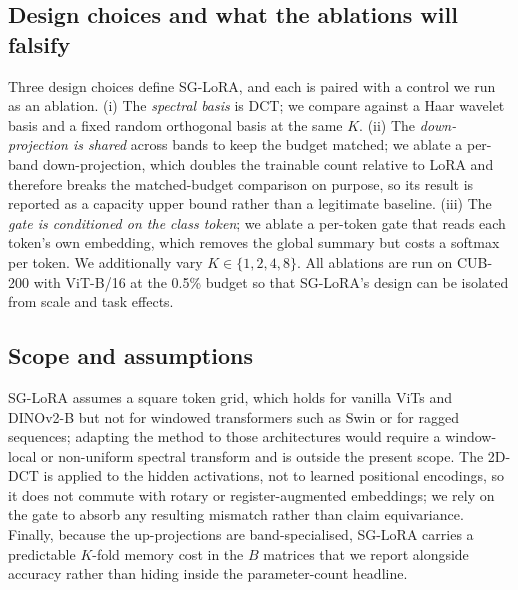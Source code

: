 \documentclass{article}
\begin{document}
\subsection{Design choices and what the ablations will falsify}

Three design choices define SG-LoRA, and each is paired with a control
we run as an ablation. (i) The \emph{spectral basis} is DCT; we compare
against a Haar wavelet basis and a fixed random orthogonal basis at
the same $K$. (ii) The \emph{down-projection is shared} across bands
to keep the budget matched; we ablate a per-band down-projection,
which doubles the trainable count relative to LoRA and therefore
breaks the matched-budget comparison on purpose, so its result is
reported as a capacity upper bound rather than a legitimate baseline.
(iii) The \emph{gate is conditioned on the class token}; we ablate a
per-token gate that reads each token's own embedding, which removes
the global summary but costs a softmax per token. We additionally vary
$K \in \{1,2,4,8\}$. All ablations are run on CUB-200 with ViT-B/16 at
the 0.5\% budget so that SG-LoRA's design can be isolated from scale
and task effects.

\subsection{Scope and assumptions}

SG-LoRA assumes a square token grid, which holds for vanilla ViTs
\citep{dosovitskiy2021vit} and DINOv2-B \citep{oquab2024dinov2} but
not for windowed transformers such as Swin \citep{liu2021swin} or for
ragged sequences; adapting the method to those architectures would
require a window-local or non-uniform spectral transform and is
outside the present scope. The 2D-DCT is applied to the hidden
activations, not to learned positional encodings, so it does not
commute with rotary or register-augmented embeddings; we rely on the
gate to absorb any resulting mismatch rather than claim equivariance.
Finally, because the up-projections are band-specialised, SG-LoRA
carries a predictable $K$-fold memory cost in the $B$ matrices that
we report alongside accuracy rather than hiding inside the
parameter-count headline.
\end{document}
